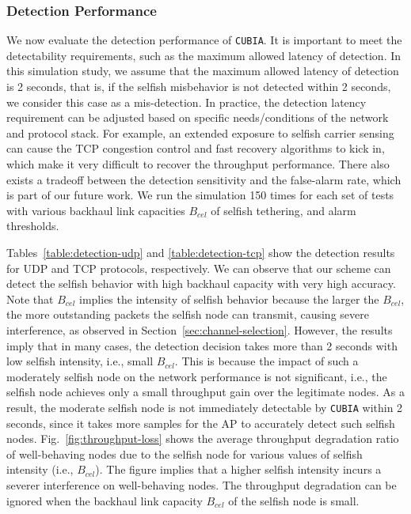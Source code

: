 \subsubsection{Detection Performance}

We now evaluate the detection performance of {\tt CUBIA}.
%
It is important to meet the detectability requirements, such as the
maximum allowed latency of detection. In this simulation study,
we assume that the maximum allowed latency of detection is 2 seconds,
that is, if the selfish misbehavior is not detected within 2 seconds,
we consider this case as a mis-detection.
%
In practice, the detection latency requirement can be adjusted based
on specific needs/conditions of the network and protocol stack.
For example, an extended exposure to selfish carrier sensing can cause
the TCP congestion control and fast recovery algorithms to kick in,
which make it very difficult to recover the throughput performance.
%
There also exists a tradeoff between the detection sensitivity and
the false-alarm rate, which is part of our future work.
%
We run the simulation 150 times for each set of tests with various
backhaul link capacities $B_{cel}$ of selfish tethering, and
alarm thresholds.

Tables~\ref{table:detection-udp} and \ref{table:detection-tcp}
show the detection results for UDP and TCP protocols, respectively.
We can observe that our scheme can detect the selfish behavior with
high backhaul capacity with very high accuracy.
%
Note that $B_{cel}$ implies the intensity of selfish behavior
because the larger the $B_{cel}$, the more outstanding packets the
selfish node can transmit, causing severe interference, as observed
in Section~\ref{sec:channel-selection}.
%
However, the results imply that in many cases, the detection decision
takes more than 2 seconds with low selfish intensity, i.e., small $B_{cel}$.
%
This is because the impact of such a moderately selfish node on the
network performance is not significant, i.e., the selfish node achieves
only a small throughput gain over the legitimate nodes. As a result,
the moderate selfish node is not immediately detectable by {\tt CUBIA}
within 2 seconds, since it takes more samples for the AP to accurately
detect such selfish nodes.
%
Fig.~\ref{fig:throughput-loss} shows the average throughput
degradation ratio of well-behaving nodes due to the selfish node
for various values of selfish intensity (i.e., $B_{cel}$).
The figure implies that a higher selfish intensity incurs
a severer interference on well-behaving nodes.
The throughput degradation can be ignored when the backhaul link
capacity $B_{cel}$ of the selfish node is small.

